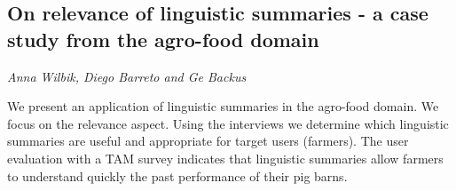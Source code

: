 \documentclass[../booklet.tex]{subfiles}
\begin{document}
\subsection[On relevance of linguistic summaries - a case study from the agro-food domain. {\it Anna Wilbik, Diego Barreto and Ge Backus}]{On relevance of linguistic summaries - a case study from the agro-food domain}
  

\begin{center}
  {\it Anna Wilbik, Diego Barreto and Ge Backus}
\end{center}

\vskip 0.8cm


We present an application of linguistic summaries in the agro-food domain. We focus on the relevance aspect. Using the interviews we  determine which linguistic summaries are useful and appropriate for target users (farmers). The user evaluation with a TAM survey indicates that linguistic summaries allow farmers to understand quickly the past performance of their pig barns.

\end{document}
